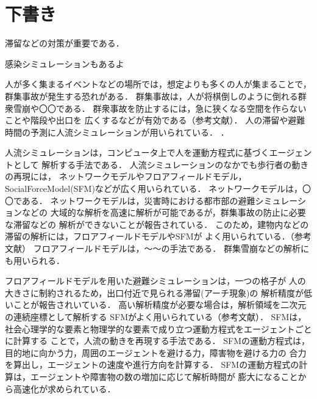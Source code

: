 \section{下書き}
滞留などの対策が重要である\cite{taisaku1}\cite{taisaku2}．

感染シミュレーションもあるよ\cite{mas_pandemic}

人が多く集まるイベントなどの場所では，想定よりも多くの人が集まることで，
群集事故が発生する恐れがある．
群集事故は，人が将棋倒しのように倒れる群衆雪崩や〇〇である．
群衆事故を防止するには，急に狭くなる空間を作らないことや階段や出口を
広くするなどが有効である（参考文献）．
人の滞留や避難時間の予測に人流シミュレーションが用いられている．
\cite{sim_jirei1}\cite{sim_jirei2}\cite{sim_jirei3}\cite{sim_jirei8}\cite{sim_jirei7}．

人流シミュレーションは，コンピュータ上で人を運動方程式に基づくエージェントとして
解析する手法である．
人流シミュレーションのなかでも歩行者の動きの再現には，
ネットワークモデルやフロアフィールドモデル，SocialForceModel(SFM)などが広く用いられている\cite{helbing_sfm}\cite{sfm_ntt}．
ネットワークモデルは，〇〇である．
ネットワークモデルは，災害時における都市部の避難シミュレーションなどの
大域的な解析を高速に解析が可能であるが，群集事故の防止に必要な滞留などの
解析ができないことが報告されている．
このため，建物内などの滞留の解析には，フロアフィールドモデルやSFMが
よく用いられている．（参考文献）
フロアフィールドモデルは，～～の手法である\cite{floa_field1}\cite{floa_field2}．
群集雪崩などの解析にも用いられる\cite{floa_field3}．



フロアフィールドモデルを用いた避難シミュレーションは，一つの格子が
人の大きさに制約されるため，出口付近で見られる滞留(アーチ現象)の
解析精度が低いことが報告されいている．
高い解析精度が必要な場合は，解析領域を二次元の連続座標として解析する
SFMがよく用いられている（参考文献）．
SFMは，社会心理学的な要素と物理学的な要素で成り立つ運動方程式をエージェントごとに計算する
ことで，人流の動きを再現する手法である\cite{helbing_sfm}．
SFMの運動方程式は，目的地に向かう力，周囲のエージェントを避ける力，障害物を避ける力の
合力を算出し，エージェントの速度や進行方向を計算する．
SFMの運動方程式の計算は，エージェントや障害物の数の増加に応じて解析時間が
膨大になることから高速化が求められている．


